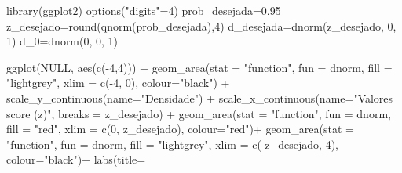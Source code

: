 \documentclass[
]{book}
\newenvironment{Shaded}{\begin{snugshade}}{\end{snugshade}}
\newcommand{\AttributeTok}[1]{\textcolor[rgb]{0.77,0.63,0.00}{#1}}
\newcommand{\ConstantTok}[1]{\textcolor[rgb]{0.00,0.00,0.00}{#1}}
\newcommand{\DecValTok}[1]{\textcolor[rgb]{0.00,0.00,0.81}{#1}}
\newcommand{\FloatTok}[1]{\textcolor[rgb]{0.00,0.00,0.81}{#1}}
\newcommand{\FunctionTok}[1]{\textcolor[rgb]{0.00,0.00,0.00}{#1}}
\newcommand{\NormalTok}[1]{#1}
\newcommand{\OtherTok}[1]{\textcolor[rgb]{0.56,0.35,0.01}{#1}}
\newcommand{\SpecialCharTok}[1]{\textcolor[rgb]{0.00,0.00,0.00}{#1}}
\newcommand{\StringTok}[1]{\textcolor[rgb]{0.31,0.60,0.02}{#1}}
\begin{document}
\begin{Shaded}
\begin{Highlighting}[]
\FunctionTok{library}\NormalTok{(ggplot2)}
\FunctionTok{options}\NormalTok{(}\StringTok{"digits"}\OtherTok{=}\DecValTok{4}\NormalTok{)}
\NormalTok{prob\_desejada}\OtherTok{=}\FloatTok{0.95}
\NormalTok{z\_desejado}\OtherTok{=}\FunctionTok{round}\NormalTok{(}\FunctionTok{qnorm}\NormalTok{(prob\_desejada),}\DecValTok{4}\NormalTok{)}
\NormalTok{d\_desejada}\OtherTok{=}\FunctionTok{dnorm}\NormalTok{(z\_desejado, }\DecValTok{0}\NormalTok{, }\DecValTok{1}\NormalTok{)}
\NormalTok{d\_0}\OtherTok{=}\FunctionTok{dnorm}\NormalTok{(}\DecValTok{0}\NormalTok{, }\DecValTok{0}\NormalTok{, }\DecValTok{1}\NormalTok{)}

\FunctionTok{ggplot}\NormalTok{(}\ConstantTok{NULL}\NormalTok{, }\FunctionTok{aes}\NormalTok{(}\FunctionTok{c}\NormalTok{(}\SpecialCharTok{{-}}\DecValTok{4}\NormalTok{,}\DecValTok{4}\NormalTok{))) }\SpecialCharTok{+}
  \FunctionTok{geom\_area}\NormalTok{(}\AttributeTok{stat =} \StringTok{"function"}\NormalTok{, }
            \AttributeTok{fun =}\NormalTok{ dnorm, }
            \AttributeTok{fill =} \StringTok{"lightgrey"}\NormalTok{, }
            \AttributeTok{xlim =} \FunctionTok{c}\NormalTok{(}\SpecialCharTok{{-}}\DecValTok{4}\NormalTok{, }\DecValTok{0}\NormalTok{),}
            \AttributeTok{colour=}\StringTok{"black"}\NormalTok{) }\SpecialCharTok{+}
  \FunctionTok{scale\_y\_continuous}\NormalTok{(}\AttributeTok{name=}\StringTok{"Densidade"}\NormalTok{) }\SpecialCharTok{+}
  \FunctionTok{scale\_x\_continuous}\NormalTok{(}\AttributeTok{name=}\StringTok{"Valores score (z)"}\NormalTok{, }\AttributeTok{breaks =}\NormalTok{ z\_desejado) }\SpecialCharTok{+} 
  \FunctionTok{geom\_area}\NormalTok{(}\AttributeTok{stat =} \StringTok{"function"}\NormalTok{,}
            \AttributeTok{fun =}\NormalTok{ dnorm, }
            \AttributeTok{fill =} \StringTok{"red"}\NormalTok{, }
            \AttributeTok{xlim =} \FunctionTok{c}\NormalTok{(}\DecValTok{0}\NormalTok{, z\_desejado),}
            \AttributeTok{colour=}\StringTok{"red"}\NormalTok{)}\SpecialCharTok{+}
  \FunctionTok{geom\_area}\NormalTok{(}\AttributeTok{stat =} \StringTok{"function"}\NormalTok{,}
            \AttributeTok{fun =}\NormalTok{ dnorm, }
            \AttributeTok{fill =} \StringTok{"lightgrey"}\NormalTok{, }
            \AttributeTok{xlim =} \FunctionTok{c}\NormalTok{( z\_desejado, }\DecValTok{4}\NormalTok{),}
            \AttributeTok{colour=}\StringTok{"black"}\NormalTok{)}\SpecialCharTok{+}
  \FunctionTok{labs}\NormalTok{(}\AttributeTok{title=} 

\end{Highlighting}
\end{Shaded}
\end{document}

